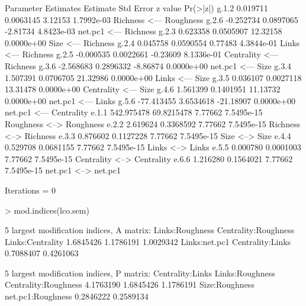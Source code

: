 \documentclass[12pt]{article}
\begin{document}
\begin{Schunk}
\begin{Soutput}
 Parameter Estimates
      Estimate   Std Error  z value   Pr(>|z|)                             
g.1.2   0.019711  0.0063145   3.12153 1.7992e-03 Richness <--- Roughness   
g.2.6  -0.252734  0.0897065  -2.81734 4.8423e-03 net.pc1 <--- Richness     
g.2.3   0.623358  0.0505907  12.32158 0.0000e+00 Size <--- Richness        
g.2.4   0.045758  0.0590554   0.77483 4.3844e-01 Links <--- Richness       
g.2.5  -0.000535  0.0022661  -0.23609 8.1336e-01 Centrality <--- Richness  
g.3.6  -2.568683  0.2896332  -8.86874 0.0000e+00 net.pc1 <--- Size         
g.3.4   1.507391  0.0706705  21.32986 0.0000e+00 Links <--- Size           
g.3.5   0.036107  0.0027118  13.31478 0.0000e+00 Centrality <--- Size      
g.4.6   1.561399  0.1401951  11.13732 0.0000e+00 net.pc1 <--- Links        
g.5.6 -77.413455  3.6534618 -21.18907 0.0000e+00 net.pc1 <--- Centrality   
e.1.1 542.975478 69.8215478   7.77662 7.5495e-15 Roughness <--> Roughness  
e.2.2   2.619624  0.3368592   7.77662 7.5495e-15 Richness <--> Richness    
e.3.3   0.876602  0.1127228   7.77662 7.5495e-15 Size <--> Size            
e.4.4   0.529708  0.0681155   7.77662 7.5495e-15 Links <--> Links          
e.5.5   0.000780  0.0001003   7.77662 7.5495e-15 Centrality <--> Centrality
e.6.6   1.216280  0.1564021   7.77662 7.5495e-15 net.pc1 <--> net.pc1      

 Iterations =  0 
\end{Soutput}
\begin{Sinput}
> mod.indices(lco.sem)
\end{Sinput}
\begin{Soutput}
 5 largest modification indices, A matrix:
     Links:Roughness Centrality:Roughness     Links:Centrality 
           1.6845426            1.1786191            1.0029342 
       Links:net.pc1     Centrality:Links 
           0.7088407            0.4261063 

  5 largest modification indices, P matrix:
    Centrality:Links      Links:Roughness Centrality:Roughness 
           4.1763190            1.6845426            1.1786191 
      Size:Roughness    net.pc1:Roughness 
           0.2846222            0.2589134 
\end{Soutput}
\end{Schunk}
\end{document}
